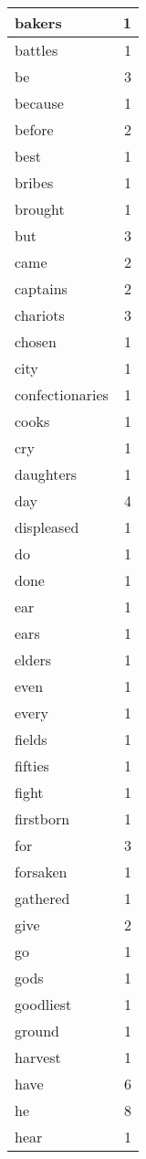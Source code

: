 \begin{center}
\begin{longtable}{l|r}
bakers & 1 \\ \hline
battles & 1 \\ \hline
be & 3 \\ \hline
because & 1 \\ \hline
before & 2 \\ \hline
best & 1 \\ \hline
bribes & 1 \\ \hline
brought & 1 \\ \hline
but & 3 \\ \hline
came & 2 \\ \hline
captains & 2 \\ \hline
chariots & 3 \\ \hline
chosen & 1 \\ \hline
city & 1 \\ \hline
confectionaries & 1 \\ \hline
cooks & 1 \\ \hline
cry & 1 \\ \hline
daughters & 1 \\ \hline
day & 4 \\ \hline
displeased & 1 \\ \hline
do & 1 \\ \hline
done & 1 \\ \hline
ear & 1 \\ \hline
ears & 1 \\ \hline
elders & 1 \\ \hline
even & 1 \\ \hline
every & 1 \\ \hline
fields & 1 \\ \hline
fifties & 1 \\ \hline
fight & 1 \\ \hline
firstborn & 1 \\ \hline
for & 3 \\ \hline
forsaken & 1 \\ \hline
gathered & 1 \\ \hline
give & 2 \\ \hline
go & 1 \\ \hline
gods & 1 \\ \hline
goodliest & 1 \\ \hline
ground & 1 \\ \hline
harvest & 1 \\ \hline
have & 6 \\ \hline
he & 8 \\ \hline
hear & 1 \\ \hline

\end{longtable}
\end{center}
